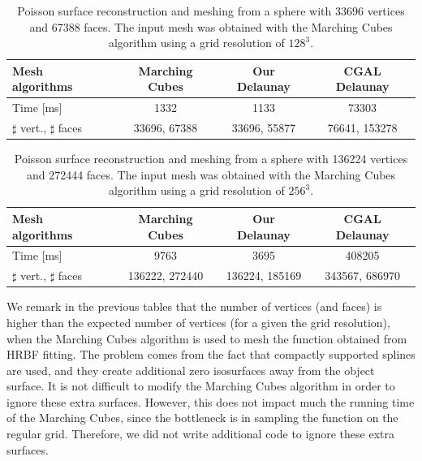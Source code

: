 \documentclass{article}
\begin{document}
\begin{table}
 \caption{Poisson surface reconstruction and meshing from a sphere with 33696 vertices and 67388 faces. The input mesh was obtained with the Marching Cubes algorithm using a grid resolution of $128^3$.}
\label{Pois_128}
  \begin{tabular}{|l|c|c|c|} \hline
    Mesh algorithms & Marching Cubes & Our Delaunay & CGAL Delaunay \\  \hline
    Time [ms] & 1332 & 1133 & 73303\\ \hline
    $\sharp$ vert., $\sharp$ faces & 33696, 67388 & 33696, 55877 &76641, 153278 \\ \hline
  \end{tabular}
 \end{table} 
 
\begin{table}
 \caption{Poisson surface reconstruction and meshing from a sphere with 136224 vertices and 272444 faces. The input mesh was obtained with the Marching Cubes algorithm using a grid resolution of $256^3$.}
\label{Pois_256}
  \begin{tabular}{|l|c|c|c|} \hline
    Mesh algorithms & Marching Cubes & Our Delaunay & CGAL Delaunay \\  \hline
    Time [ms] & 9763 & 3695 & 408205\\ \hline
    $\sharp$ vert., $\sharp$ faces & 136222, 272440& 136224, 185169 &343567, 686970 \\ \hline
  \end{tabular}
\end{table}

We remark in the previous tables that the number of vertices (and faces) is higher than the expected number of vertices (for a given the grid resolution), when the Marching Cubes algorithm is used to mesh the function obtained from HRBF fitting.
The problem comes from the fact that compactly supported splines are used, and they create additional zero isosurfaces away from the object surface. It is not difficult to modify the Marching Cubes algorithm in order to ignore these extra surfaces. However, this does not impact much the running time of the Marching Cubes, since the bottleneck is in sampling the function on the regular grid. Therefore, we did not write additional code to ignore these extra surfaces.
\end{document}
